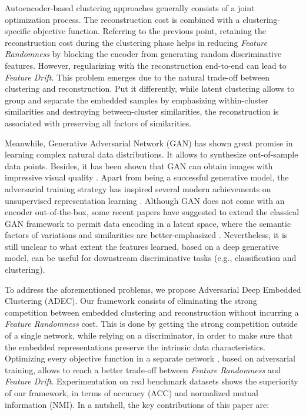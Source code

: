 \documentclass{article}
\begin{document}
Autoencoder-based clustering approaches generally consists of a joint optimization process. The reconstruction cost is combined with a clustering-specific objective function.
Referring to the previous point, retaining the reconstruction cost during the clustering phase helps in reducing \textit{Feature Randomness} by blocking the encoder from generating random discriminative features. However, regularizing with the reconstruction end-to-end can lead to \textit{Feature Drift}. This problem emerges due to the natural trade-off between clustering and reconstruction. Put it differently, while latent clustering allows to group and separate the embedded samples by emphasizing within-cluster similarities and destroying between-cluster similarities, the reconstruction is associated with preserving all factors of similarities.

Meanwhile, Generative Adversarial Network (GAN) \cite{paper1} has shown great promise in learning complex natural data distributions. It allows to synthesize out-of-sample data points. Besides, it has been shown that GAN can obtain images with impressive visual quality \cite{paper18,paper32}. Apart from being a successful generative model, the adversarial training strategy has inspired several modern achievements on unsupervised representation learning \cite{paper5,paper6,paper7,paper9}. Although GAN does not come with an encoder out-of-the-box, some recent papers have suggested to extend the classical GAN framework to permit data encoding in a latent space, where the semantic factors of variations and similarities are better-emphasized \cite{paper6,paper7,paper10,paper8}. Nevertheless, it is still unclear to what extent the features learned, based on a deep generative model, can be useful for downstream discriminative tasks (e.g., classification and clustering). 

To address the aforementioned problems, we propose Adversarial Deep Embedded Clustering (ADEC). Our framework consists of eliminating the strong competition between embedded clustering and reconstruction without incurring a \textit{Feature Randomness} cost. This is done by getting the strong competition outside of a single network, while relying on a discriminator, in order to make sure that the embedded representations preserve the intrinsic data characteristics. Optimizing every objective function in a separate network , based on adversarial training, allows to reach a better trade-off between \textit{Feature Randomness} and \textit{Feature Drift}. Experimentation on real benchmark datasets shows the superiority of our framework, in terms of accuracy (ACC) and normalized mutual information (NMI). In a nutshell, the key contributions of this paper are:
\end{document}
